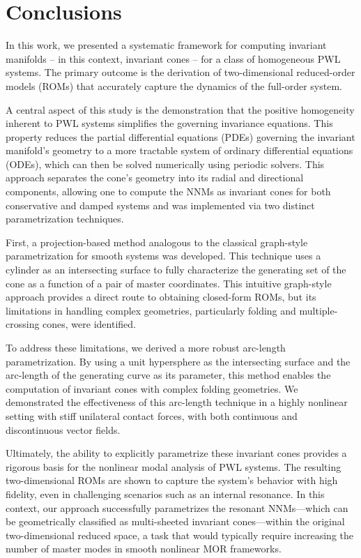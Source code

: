 \documentclass[a4paper,9pt,parskip=half,english]{article}
\theoremstyle{plain}
\theoremstyle{definition}
\begin{document}
\section{Conclusions}\label{Section_Conclusion}
In this work, we presented a systematic framework for computing invariant manifolds -- in this context, invariant cones -- for a class of homogeneous PWL systems. The primary outcome is the derivation of two-dimensional reduced-order models (ROMs) that accurately capture the dynamics of the full-order system.

A central aspect of this study is the demonstration that the positive homogeneity inherent to PWL systems simplifies the governing invariance equations. This property reduces the partial differential equations (PDEs) governing the invariant manifold's geometry to a more tractable system of ordinary differential equations (ODEs), which can then be solved numerically using periodic solvers. This approach separates the cone's geometry into its radial and directional components, allowing one to compute the NNMs as invariant cones for both conservative and damped systems and was implemented via two distinct parametrization techniques. 

First, a projection-based method analogous to the classical graph-style parametrization for smooth systems was developed. This technique uses a cylinder as an intersecting surface to fully characterize the generating set of the cone as a function of a pair of master coordinates. This intuitive graph-style approach provides a direct route to obtaining closed-form ROMs, but its limitations in handling complex geometries, particularly folding and multiple-crossing cones, were identified. 

To address these limitations, we derived a more robust arc-length parametrization. By using a unit hypersphere as the intersecting surface and the arc-length of the generating curve as its parameter, this method enables the computation of invariant cones with complex folding geometries. We demonstrated the effectiveness of this arc-length technique in a highly nonlinear setting with stiff unilateral contact forces, with both continuous and discontinuous vector fields. 

Ultimately, the ability to explicitly parametrize these invariant cones provides a rigorous basis for the nonlinear modal analysis of PWL systems. The resulting two-dimensional ROMs are shown to capture the system's behavior with high fidelity, even in challenging scenarios such as an internal resonance. In this context, our approach successfully parametrizes the resonant NNMs—which can be geometrically classified as multi-sheeted invariant cones—within the original two-dimensional reduced space, a task that would typically require increasing the number of master modes in smooth nonlinear MOR frameworks.
\end{document}
